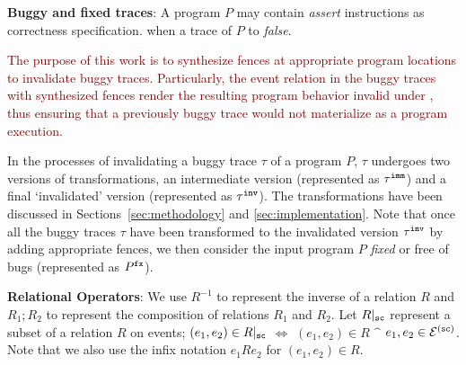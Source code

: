 \noindent
{\bf Buggy and fixed traces}: A program $P$ may contain {\em assert} 
instructions as correctness specification. 
 when a trace of $P$ 
  to
{\em false}. 


\textcolor{Maroon}{The purpose of this work 
is to synthesize \cc fences at appropriate
program locations to invalidate buggy traces. Particularly, the
event relation in the buggy traces with synthesized fences
render the resulting program behavior invalid under \cc, thus ensuring
that a previously buggy trace would not materialize as a 
\cc program execution.} 

 


In the processes of invalidating a buggy trace $\tau$ of a program $P$,
$\tau$ undergoes two versions of transformations, an intermediate version
(represented as ${\tau}^{\mathtt{imm}}$) and a final `invalidated' version (represented
as ${\tau}^{\mathtt{inv}}$). The transformations have been discussed in 
Sections~\ref{sec:methodology} and \ref{sec:implementation}.
%
Note that once all the buggy traces $\tau$ have been transformed to 
the invalidated version
${\tau}^{\mathtt{inv}}$ by adding appropriate fences, we then consider the input 
program $P$ {\em fixed} or free of bugs (represented as ${P}^{\mathtt{fx}}$). 

\noindent
{\bf Relational Operators}: 
We use $R^{-1}$ to represent the inverse of a relation $R$ and 
$R_1;R_2$ to represent the composition of relations $R_1$ and $R_2$.
Let ${R{|}_\texttt{sc}} $ represent a subset of a relation $R$ on \sc events;
\ie $(e_1,e_2) \in {R{|}_\texttt{sc}} $ $\iff$ $(e_1,e_2) \in R$ $\^$
$e_1,e_2 \in \mathcal{E}^{(\texttt{sc})}$. Note that we also use the infix 
notation $e_1Re_2$ for $(e_1,e_2) \in R$.
